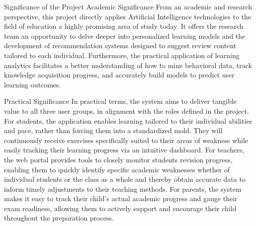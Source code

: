 Significance of the Project
Academic Significance
From an academic and research perspective, this project directly applies Artificial Intelligence technologies to the field of education a highly promising area of study today. It offers the research team an opportunity to delve deeper into personalized learning models and the development of recommendation systems designed to suggest review content tailored to each individual. Furthermore, the practical application of learning analytics facilitates a better understanding of how to mine behavioral data, track knowledge acquisition progress, and accurately build models to predict user learning outcomes.

Practical Significance
In practical terms, the system aims to deliver tangible value to all three user groups, in alignment with the roles defined in the project.
For students, the application enables learning tailored to their individual abilities and pace, rather than forcing them into a standardized mold. They will continuously receive exercises specifically suited to their areas of weakness while easily tracking their learning progress via an intuitive dashboard.
For teachers, the web portal provides tools to closely monitor students revision progress, enabling them to quickly identify specific academic weaknesses whether of individual students or the class as a whole and thereby obtain accurate data to inform timely adjustments to their teaching methods.
For parents, the system makes it easy to track their child's actual academic progress and gauge their exam readiness, allowing them to actively support and encourage their child throughout the preparation process.


